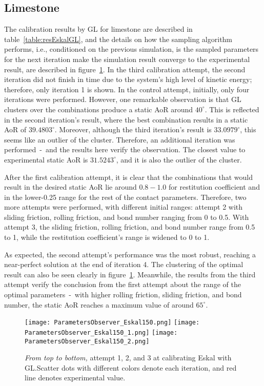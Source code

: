 \subsection{Limestone}
The calibration results by GL for limestone are described in table~\ref{table:resEskalGL}, and the details on how the sampling algorithm performs, i.e., conditioned on the previous simulation, is the sampled parameters for the next iteration make the simulation result converge to the experimental result, are described in figure~\ref{fig:EskalGL}. In the third calibration attempt, the second iteration did not finish in time due to the system's high level of kinetic energy; therefore, only iteration 1 is shown. 
In the control attempt, initially, only four iterations were performed. However, one remarkable observation is that GL clusters over the combinations produce a static AoR around $40^{\circ}$. This is reflected in the second iteration's result, where the best combination results in a static AoR of $39.4803^{\circ}$. Moreover, although the third iteration's result is $33.0979^{\circ}$, this seems like an outlier of the cluster. Therefore, an additional iteration was performed~-~and the results here verify the observation. The closest value to experimental static AoR is $31.5243^{\circ}$, and it is also the outlier of the cluster. 

After the first calibration attempt, it is clear that the combinations that would result in the desired static AoR lie around $0.8-1.0$ for restitution coefficient and in the lower-0.25 range for the rest of the contact parameters. Therefore, two more attempts were performed, with different initial ranges: attempt 2 with sliding friction, rolling friction, and bond number ranging from 0 to 0.5. With attempt 3, the sliding friction, rolling friction, and bond number range from 0.5 to 1, while the restitution coefficient's range is widened to 0 to 1. 

As expected, the second attempt's performance was the most robust, reaching a near-perfect solution at the end of iteration 4. The clustering of the optimal result can also be seen clearly in figure~\ref{fig:EskalGL}. Meanwhile, the results from the third attempt verify the conclusion from the first attempt about the range of the optimal parameters~-~with higher rolling friction, sliding friction, and bond number, the static AoR reaches a maximum value of around $65^{\circ}$.



\begin{figure}[H]
    \centering
    \texttt{[image: ParametersObserver\_Eskal150.png]}
    \texttt{[image: ParametersObserver\_Eskal150\_1.png]}
    \texttt{[image: ParametersObserver\_Eskal150\_2.png]}
    \caption{\textit{From top to bottom,} attempt 1, 2, and 3 at calibrating Eskal with GL.\@ Scatter dots with different colors denote each iteration, and red line denotes experimental value.}\label{fig:EskalGL}
\end{figure}




